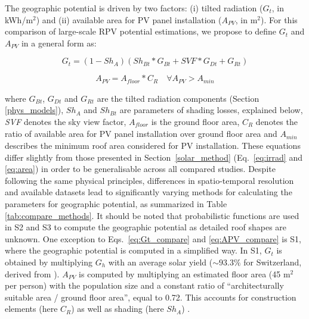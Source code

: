 The geographic potential is driven by two factors: (i) tilted radiation ($G_t$, in kWh/m$^2$) and (ii) available area for PV panel installation ($A_{PV}$, in m$^2$). For this comparison of large-scale RPV potential estimations, we propose to define $G_t$ and $A_{PV}$ in a general form as:

\begin{equation}
\label{eq:Gt_compare}
    G_t = (1 - Sh_A) (Sh_{Bt} * G_{Bt} + \mathit{SVF} * G_{Dt} + G_{Rt})
\end{equation}

\begin{equation}
\label{eq:APV_compare}
    A_{PV} = A_{\mathit{floor}} * C_R \quad \forall A_{PV} > A_{min} 
\end{equation}

where $G_{Bt}$, $G_{Dt}$ and $G_{Rt}$ are the tilted radiation components (Section \ref{phys_models}), $Sh_A$ and $Sh_{Bt}$ are parameters of shading losses, explained below, \textit{SVF} denotes the sky view factor, $A_{\mathit{floor}}$ is the ground floor area, $C_R$ denotes the ratio of available area for PV panel installation over ground floor area and $A_{min}$ describes the minimum roof area considered for PV installation. 
These equations differ slightly from those presented in Section~\ref{solar_method} (Eq.~\ref{eq:irrad} and \ref{eq:area}) in order to be generalisable across all compared studies. 
Despite following the same physical principles, differences in spatio-temporal resolution and available datasets lead to significantly varying methods for calculating the parameters for geographic potential, as summarized in Table \ref{tab:compare_methods}. It should be noted that probabilistic functions are used in S2 and S3 to compute the geographic potential as detailed roof shapes are unknown. One exception to Eqs.~\ref{eq:Gt_compare} and \ref{eq:APV_compare} is S1, where the geographic potential is computed in a simplified way. In S1, $G_t$ is obtained by multiplying $G_h$ with an average solar yield ($\sim 93.3\%$ for Switzerland, derived from \cite{iea_potential_2002}). $A_{PV}$ is computed by multiplying an estimated floor area (45 m$^2$ per person) with the population size and a constant ratio of “architecturally suitable area / ground floor area”, equal to 0.72. This accounts for construction elements (here $C_R$) as well as shading (here $Sh_A$) \cite{iea_potential_2002}.

